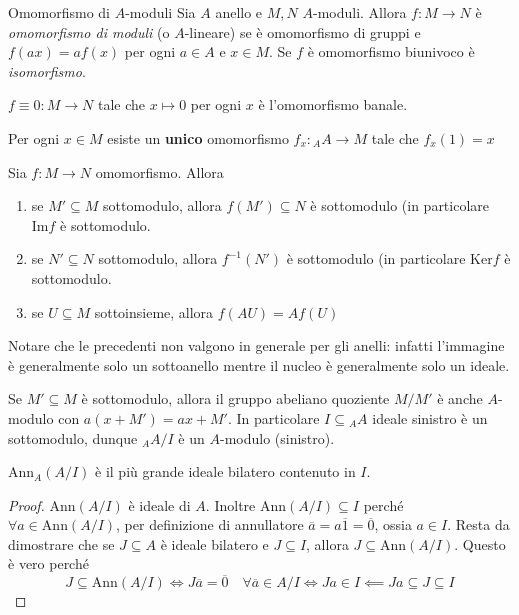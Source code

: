 \begin{definition}{Omomorfismo di \(A\)-moduli }
    Sia \(A\) anello e \(M, N\) \(A\)-moduli. Allora \(f: M \to N\) è
    \emph{omomorfismo di moduli} (o \(A\)-lineare) se è omomorfismo di gruppi e
    \(f{(ax)} = af{(x)}\) per ogni \(a \in A\) e \(x \in M\). Se \(f\) è
    omomorfismo biunivoco è \emph{isomorfismo}.
\end{definition}
\begin{example}{}
    \(f \equiv 0 : M \to N\) tale che \(x \mapsto 0\) per ogni \(x\) è
    l'omomorfismo banale.
\end{example}
\begin{example}{}
    Per ogni \(x \in M\) esiste un \textbf{unico} omomorfismo \(f_x : {}_AA \to
    M\) tale che \(f_x{(1)} = x\) 
\end{example}
\begin{proposition}{}
    Sia \(f : M \to N\) omomorfismo. Allora
\begin{enumerate}[label = \arabic*)]
    \item se \(M' \subseteq M \) sottomodulo, allora \(f{(M')} \subseteq N\) è
        sottomodulo (in particolare \(\mathrm{Im}f\) è sottomodulo.
    \item se \(N' \subseteq N \) sottomodulo, allora \(f^{-1}{(N')}\) è
        sottomodulo (in particolare \(\mathrm{Ker}f\) è sottomodulo.
    \item se \(U \subseteq M \) sottoinsieme, allora \(f{(AU)} = Af{(U)}\) 
\end{enumerate}
\end{proposition}
\begin{remark}{}
    Notare che le precedenti non valgono in generale per gli anelli: infatti
    l'immagine è generalmente solo un sottoanello mentre il nucleo è
    generalmente solo un ideale.
\end{remark}

Se \(M' \subseteq M \) è sottomodulo, allora il gruppo abeliano quoziente \(M /
M'\) è anche \(A\)-modulo con \(a{(x + M')} = ax + M'\). In particolare \(I
\subseteq {}_AA\) ideale sinistro è un sottomodulo, dunque \({}_AA / I\) è un \(A\)-modulo
(sinistro).

\begin{lemma}{}
    \(\mathrm{Ann}_A{(A / I)}\) è il più grande ideale bilatero contenuto in \(I\).
\end{lemma}
\begin{proof}{}
    \(\mathrm{Ann}{(A / I)}\) è ideale di \(A\). Inoltre \(\mathrm{Ann}{(A /I) }
    \subseteq I \) perché \(\forall a \in \mathrm{Ann}{(A /I)}\), per
    definizione di annullatore \(\overline{a} = a \overline{1} = \overline{0}\),
    ossia \(a \in I\). Resta da dimostrare che se \(J \subseteq A\) è ideale
    bilatero e \(J \subseteq I \), allora \(J \subseteq \mathrm{Ann}{(A / I)}
    \). Questo è vero perché 
        \[
          J \subseteq  \mathrm{Ann}{(A / I)} \iff J\overline{a} = \overline{0}
          \quad \forall \overline{a} \in  A/I \iff Ja \in I \impliedby Ja
          \subseteq J \subseteq I  
        \]
\end{proof}

